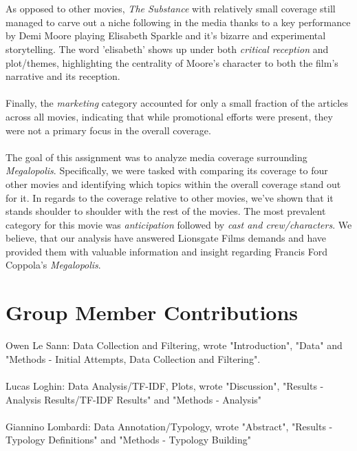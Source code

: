 \documentclass[letterpaper]{article} %
\begin{document}
\\ 
\\ 
As opposed to other movies, \textit{The Substance} with relatively small coverage still managed to carve out a niche following in the media thanks to a key performance by Demi Moore playing Elisabeth Sparkle and it's bizarre and experimental storytelling. The word 'elisabeth' shows up under both \textit{critical reception} and {plot/themes}, highlighting the centrality of Moore’s character to both the film’s narrative and its reception. 
\\
\\
Finally, the \textit{marketing} category accounted for only a small fraction of the articles across all movies, indicating that while promotional efforts were present, they were not a primary focus in the overall coverage.
\\ 
\\ 
The goal of this assignment was to analyze media coverage surrounding \textit{Megalopolis}. Specifically, we were tasked with comparing its coverage to four other movies and identifying which topics within the overall coverage stand out for it. In regards to the coverage relative to other movies, we've shown that it stands shoulder to shoulder with the rest of the movies. The most prevalent category for this movie was \textit{anticipation} followed by \textit{cast and crew/characters}. We believe, that our analysis have answered Lionsgate Films demands and have provided them with valuable information and insight regarding Francis Ford Coppola's \textit{Megalopolis}.



\section{Group Member Contributions}

Owen Le Sann: Data Collection and Filtering, wrote "Introduction", "Data" and  "Methods - Initial Attempts, Data Collection and Filtering". 
\\ 
\\
Lucas Loghin: Data Analysis/TF-IDF, Plots, wrote "Discussion", "Results - Analysis Results/TF-IDF Results" and "Methods - Analysis" 
\\
\\
Giannino Lombardi: Data Annotation/Typology, wrote "Abstract", "Results - Typology Definitions" and "Methods - Typology Building" 


\end{document}
